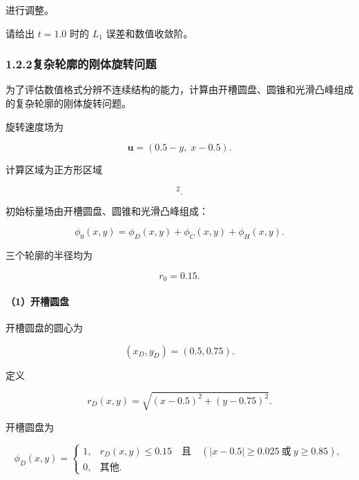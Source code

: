 \documentclass[UTF8,12pt,a4paper,fontset=fandol]{ctexart}
\begin{document}
进行调整。

请给出 $t=1.0$ 时的 $L_1$ 误差和数值收敛阶。

\subsubsection{1.2.2\quad 复杂轮廓的刚体旋转问题}
\thispagestyle{fancy}

为了评估数值格式分辨不连续结构的能力，计算由开槽圆盘、圆锥和光滑凸峰组成的复杂轮廓的刚体旋转问题。

旋转速度场为

\begin{equation}
\bm{u}=(0.5-y,\;x-0.5).
\end{equation}

计算区域为正方形区域

\begin{equation}
[0,1]^2.
\end{equation}

初始标量场由开槽圆盘、圆锥和光滑凸峰组成：

\begin{equation}
\phi_0(x,y)
=\phi_D(x,y)+\phi_C(x,y)+\phi_H(x,y).
\end{equation}

三个轮廓的半径均为

\begin{equation}
r_0=0.15.
\end{equation}

\paragraph{（1）开槽圆盘}

开槽圆盘的圆心为

\begin{equation}
(x_D,y_D)=(0.5,0.75).
\end{equation}

定义

\begin{equation}
r_D(x,y)
=\sqrt{(x-0.5)^2+(y-0.75)^2}.
\end{equation}

开槽圆盘为

\begin{equation}
\phi_D(x,y)
=
\begin{cases}
1,
&
r_D(x,y)\leq 0.15
\quad\text{且}\quad
\left(
|x-0.5|\geq 0.025
\ \text{或}\
y\geq 0.85
\right),\\[2mm]
0,
&\text{其他}.
\end{cases}
\end{equation}
\end{document}
